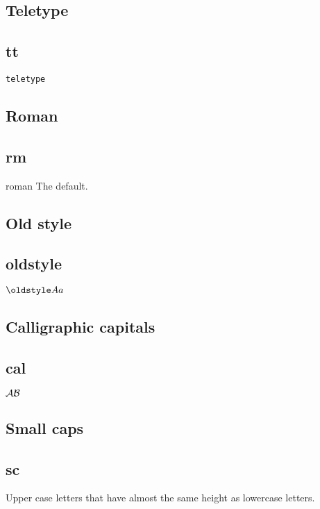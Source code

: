   \subsection{Teletype}

  \subsection{tt}

    {\tt teletype}

  \subsection{Roman}

  \subsection{rm}

    {\rm roman} The default.

  \subsection{Old style}

  \subsection{oldstyle}

    $\oldstyle Aa$

  \subsection{Calligraphic capitals}

  \subsection{cal}

    $\cal AB$

  \subsection{Small caps}

  \subsection{sc}

    Upper case letters that have almost the same height as lowercase letters.

